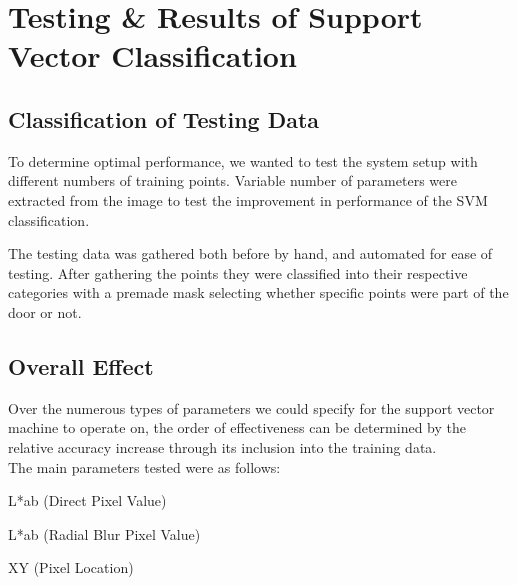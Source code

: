 \chapter {Testing \& Results of Support Vector Classification}

\section{Classification of Testing Data}
To determine optimal performance, we wanted to test the system setup with different numbers of training points. Variable number of parameters were extracted from the image to test the improvement in performance of the SVM classification.

The testing data was gathered both before by hand, and automated for ease of testing. After gathering the points they were classified into their respective categories with a premade mask selecting whether specific points were part of the door or not.

\section{Overall Effect}

Over the numerous types of parameters we could specify for the support vector machine to operate on, the order of effectiveness can be determined by the relative accuracy increase through its inclusion into the training data. 
\\
The main parameters tested were as follows:

\begin{description}
  \item L*ab (Direct Pixel Value)
  \item L*ab (Radial Blur Pixel Value)
  \item XY (Pixel Location)
\end{description}


